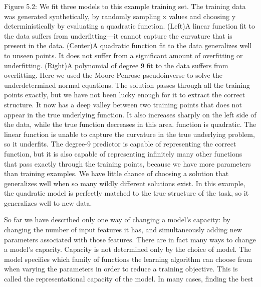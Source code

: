 \documentclass[11pt]{article}
\begin{document}
Figure 5.2: We ﬁt three models to this example training set. The training data was
generated synthetically, by randomly sampling
x
values and choosing
y
deterministically
by evaluating a quadratic function. (Left)A linear function ﬁt to the data suﬀers from
underﬁtting—it cannot capture the curvature that is present in the data. (Center)A
quadratic function ﬁt to the data generalizes well to unseen points. It does not suﬀer from
a signiﬁcant amount of overﬁtting or underﬁtting. (Right)A polynomial of degree 9 ﬁt
to the data suﬀers from overﬁtting. Here we used the Moore-Penrose pseudoinverse to
solve the underdetermined normal equations. The solution passes through all the training
points exactly, but we have not been lucky enough for it to extract the correct structure.
It now has a deep valley between two training points that does not appear in the true
underlying function. It also increases sharply on the left side of the data, while the true
function decreases in this area.
function is quadratic. The linear function is unable to capture the curvature in
the true underlying problem, so it underﬁts. The degree-9 predictor is capable of
representing the correct function, but it is also capable of representing inﬁnitely
many other functions that pass exactly through the training points, because we
have more parameters than training examples. We have little chance of choosing
a solution that generalizes well when so many wildly diﬀerent solutions exist. In
this example, the quadratic model is perfectly matched to the true structure of
the task, so it generalizes well to new data.

So far we have described only one way of changing a model’s capacity: by
changing the number of input features it has, and simultaneously adding new
parameters associated with those features. There are in fact many ways to change
a model’s capacity. Capacity is not determined only by the choice of model. The
model speciﬁes which family of functions the learning algorithm can choose from
when varying the parameters in order to reduce a training objective. This is called
the
representational capacity
of the model. In many cases, ﬁnding the best
\end{document}

